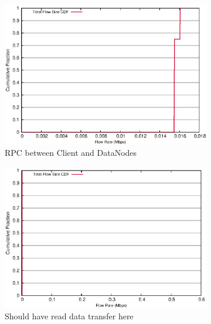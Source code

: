 \begin{figure}[!ht]
\label{fig:read_size}
\centering
  \begin{subfigure}[b]{.45\linewidth}
   \centering
	\includegraphics[width=.99\textwidth]{figures/4read/24_28_flow_size.eps} 
	\caption{RPC between Client and DataNodes}\label{fig:read_size:rpc}
   \end{subfigure}%
  \begin{subfigure}[b]{.45\linewidth}
   \centering
	\includegraphics[width=.99\textwidth]{figures/4read/8_12_flow_size.eps} 
	\caption{Should have read data transfer here}\label{fig:read_size:fixme}
   \end{subfigure} \\%
  \begin{subfigure}[b]{.75\linewidth}
   \centering

\end{subfigure}
\end{figure}
